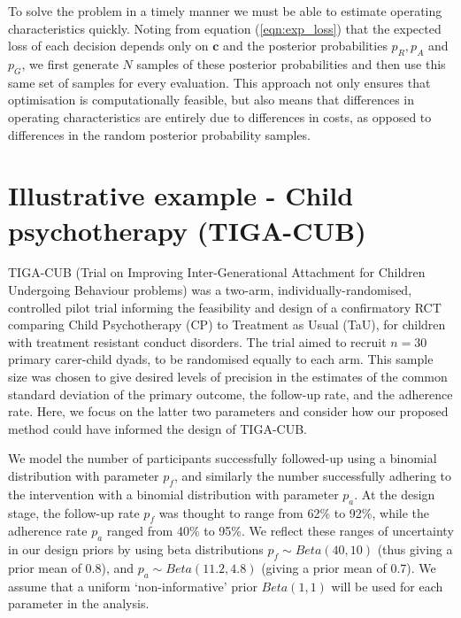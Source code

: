 \documentclass[AMA,STIX1COL]{WileyNJD-v2}
\begin{document}
To solve the problem in a timely manner we must be able to estimate operating characteristics quickly. Noting from equation (\ref{eqn:exp_loss}) that the expected loss of each decision depends only on $\mathbf{c}$ and the posterior probabilities $p_R, p_A$ and $p_G$, we first generate $N$ samples of these posterior probabilities and then use this same set of samples for every evaluation. This approach not only ensures that optimisation is computationally feasible, but also means that differences in operating characteristics are entirely due to differences in costs, as opposed to differences in the random posterior probability samples.

\section{Illustrative example - Child psychotherapy (TIGA-CUB)}\label{sec:TIGA}

TIGA-CUB (Trial on Improving Inter-Generational Attachment for Children Undergoing Behaviour problems) was a two-arm, individually-randomised, controlled pilot trial informing the feasibility and design of a confirmatory RCT comparing Child Psychotherapy (CP) to Treatment as Usual (TaU), for children with treatment resistant conduct disorders. The trial aimed to recruit $n = 30$ primary carer-child dyads, to be randomised equally to each arm. This sample size was chosen to give desired levels of precision in the estimates of the common standard deviation of the primary outcome, the follow-up rate, and the adherence rate. Here, we focus on the latter two parameters and consider how our proposed method could have informed the design of TIGA-CUB.

We model the number of participants successfully followed-up using a binomial distribution with parameter $p_f$, and similarly the number successfully adhering to the intervention with a binomial distribution with parameter $p_a$. At the design stage, the follow-up rate $p_f$ was thought to range from 62\% to 92\%, while the adherence rate $p_a$ ranged from 40\% to 95\%. We reflect these ranges of uncertainty in our design priors by using beta distributions $p_f \sim Beta(40, 10)$ (thus giving a prior mean of 0.8), and $p_a \sim Beta(11.2, 4.8)$ (giving a prior mean of 0.7). We assume that a uniform `non-informative' prior $Beta(1,1)$ will be used for each parameter in the analysis.

\end{document}
